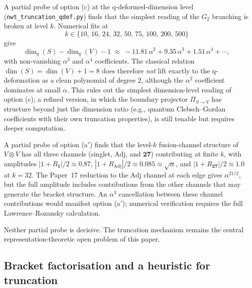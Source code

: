 \documentclass[11pt]{article}
\newcommand{\Adj}{\mathrm{Adj}}
\begin{document}
A partial probe of option (c) at the q-deformed-dimension level
(\texttt{nwt\_truncation\_qdef.py}) finds that the simplest reading
of the $G_2$ branching is broken at level $k$.  Numerical fits at
\[
  k \in \{10,\, 16,\, 24,\, 32,\, 50,\, 75,\, 100,\, 200,\, 500\}
\]
give
\begin{equation}
  \dim_q(S) - \dim_q(V) - 1
  \;\approx\;
  -11.81\,\alpha^2 + 9.35\,\alpha^3 + 1.51\,\alpha^4 + \cdots,
\end{equation}
with non-vanishing $\alpha^3$ and $\alpha^4$ coefficients.  The
classical relation $\dim(S) = \dim(V) + 1 = 8$ does therefore
\emph{not} lift exactly to the q-deformation as a clean polynomial
of degree $2$, although the $\alpha^2$ coefficient dominates at small
$\alpha$.  This rules out the simplest dimension-level reading of
option (c); a refined version, in which the boundary projector
$\Pi_{S \to V}$ has structure beyond just the dimension ratio
(e.g., quantum Clebsch--Gordan coefficients with their own truncation
properties), is still tenable but requires deeper computation.

A partial probe of option (a$'$) finds that the level-$k$
fusion-channel structure of $V \otimes V$ has all three channels
(singlet, $\Adj$, and $\mathbf{27}$) contributing at finite $k$, with
amplitudes
$|1+R_{\mathbf{1}}|/2 \approx 0.87$,
$|1+R_{\Adj}|/2 \approx 0.085 \approx \sqrt{\alpha}$, and
$|1+R_{\mathbf{27}}|/2 \approx 1.0$ at $k = 32$.  The Paper~17 reduction
to the $\Adj$ channel at each edge gives $\alpha^{21/2}$, but the full
amplitude includes contributions from the other channels that may
generate the bracket structure.  An $\alpha^3$ cancellation between
these channel contributions would manifest option (a$'$); numerical
verification requires the full Lawrence--Rozansky calculation.

Neither partial probe is decisive.  The truncation mechanism remains
the central representation-theoretic open problem of this paper.

\subsection{Bracket factorisation and a heuristic for truncation}
\label{sec:qec-bracket-factorisation}
\end{document}
